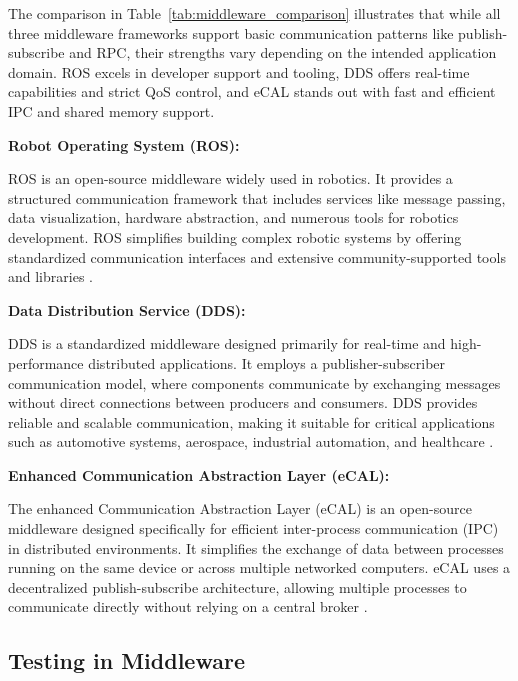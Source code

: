 \vspace{1em}
The comparison in Table~\ref{tab:middleware_comparison} illustrates that while all three middleware frameworks support basic communication patterns like publish-subscribe and RPC, their strengths vary depending on the intended application domain. ROS excels in developer support and tooling, DDS offers real-time capabilities and strict QoS control, and eCAL stands out with fast and efficient IPC and shared memory support.

\vspace{1em}
\newpage
\textbf{Robot Operating System (ROS):}
\vspace{0.4em}

ROS is an open-source middleware widely used in robotics. It provides a structured communication framework that includes services like message passing, data visualization, hardware abstraction, and numerous tools for robotics development. ROS simplifies building complex robotic systems by offering standardized communication interfaces and extensive community-supported tools and libraries \cite{quigley2009}.

\vspace{1em}
\textbf{Data Distribution Service (DDS):}
\vspace{0.4em}

DDS is a standardized middleware designed primarily for real-time and high-performance distributed applications. It employs a publisher-subscriber communication model, where components communicate by exchanging messages without direct connections between producers and consumers. DDS provides reliable and scalable communication, making it suitable for critical applications such as automotive systems, aerospace, industrial automation, and healthcare \cite{pardo2003}.

\vspace{1em}
\textbf{Enhanced Communication Abstraction Layer (eCAL):}
\vspace{0.4em}

The enhanced Communication Abstraction Layer (eCAL) is an open-source middleware designed specifically for efficient inter-process communication (IPC) in distributed environments. It simplifies the exchange of data between processes running on the same device or across multiple networked computers. eCAL uses a decentralized publish-subscribe architecture, allowing multiple processes to communicate directly without relying on a central broker \cite{ecal_github}.

\subsection{Testing in Middleware}

